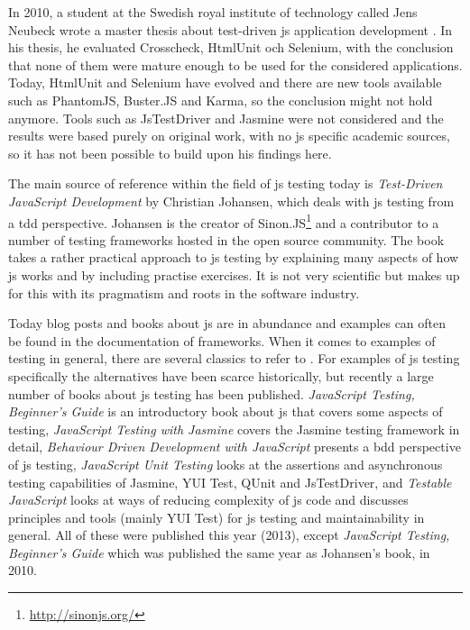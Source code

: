 \documentclass[11pt]{article}
\begin{document}
In 2010, a student at the Swedish royal institute of technology called Jens Neubeck wrote a master thesis about test-driven \gls{js} application development \cite{Neubeck}. In his thesis, he evaluated Crosscheck, HtmlUnit och Selenium, with the conclusion that none of them were mature enough to be used for the considered applications. Today, HtmlUnit and Selenium have evolved and there are new tools available such as PhantomJS, Buster.JS and Karma, so the conclusion might not hold anymore. Tools such as JsTestDriver and Jasmine were not considered and the results were based purely on original work, with no \gls{js} specific academic sources, so it has not been possible to build upon his findings here.

The main source of reference within the field of \gls{js} testing today is \emph{Test-Driven JavaScript Development} \cite{Tddjs} by Christian Johansen, which deals with \gls{js} testing from a \gls{tdd} perspective. Johansen is the creator of Sinon.JS\footnote{\url{http://sinonjs.org/}} and a contributor to a number of testing frameworks hosted in the open source community. The book takes a rather practical approach to \gls{js} testing by explaining many aspects of how \gls{js} works and by including practise exercises. It is not very scientific but makes up for this with its pragmatism and roots in the software industry.

Today blog posts and books about \gls{js} are in abundance and examples can often be found in the documentation of frameworks. When it comes to examples of testing in general, there are several classics to refer to \cite{KentBeck}\cite{TestPatterns}. For examples of \gls{js} testing specifically the alternatives have been scarce historically, but recently a large number of books about \gls{js} testing has been published. \emph{JavaScript Testing, Beginner's Guide} \cite{JSBeginners} is an introductory book about \gls{js} that covers some aspects of testing, \emph{JavaScript Testing with Jasmine} \cite{JasmineBook} covers the Jasmine testing framework in detail, \emph{Behaviour Driven Development with JavaScript} \cite{BDDJS} presents a \gls{bdd} perspective of \gls{js} testing, \emph{JavaScript Unit Testing} \cite{JSUT} looks at the assertions and asynchronous testing capabilities of Jasmine, YUI Test, QUnit and JsTestDriver, and \emph{Testable JavaScript} \cite{TestableJS} looks at ways of reducing complexity of \gls{js} code and discusses principles and tools (mainly YUI Test) for \gls{js} testing and maintainability in general. All of these were published this year (2013), except \emph{JavaScript Testing, Beginner's Guide} which was published the same year as Johansen's book, in 2010.
\end{document}
